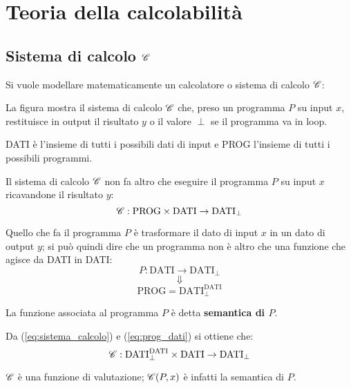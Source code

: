 \section{Teoria della calcolabilità}

\subsection{Sistema di calcolo \texorpdfstring{$\mathscr{C}$}{C}}
Si vuole modellare matematicamente un calcolatore o sistema di calcolo $\mathscr{C}$:
\vspace{.4cm}
\begin{figure}[h]
    \centering
    
\end{figure}

La figura mostra il sistema di calcolo $\mathscr{C}$ che, preso un programma $P$
su input $x$, restituisce in output il risultato $y$ o il valore $\perp$
se il programma va in loop.

DATI è l'insieme di tutti i possibili dati di input e PROG l'insieme di
tutti i possibili programmi.

Il sistema di calcolo $\mathscr{C}$ non fa altro che eseguire il programma $P$ su input
$x$ ricavandone il risultato $y$:
\begin{equation}\label{eq:sistema_calcolo}
\mathscr{C}:\text{PROG}\times\text{DATI}\rightarrow\text{DATI}_\perp
\end{equation}

Quello che fa il programma $P$ è trasformare il dato di input $x$ in un dato
di output $y$; si può quindi dire che un programma non è altro che
una funzione che agisce da DATI in DATI:
$$ P:\text{DATI} \rightarrow \text{DATI}_\perp $$
$$ \Downarrow $$
\begin{equation}\label{eq:prog_dati} \text{PROG} =
\text{DATI}^{\text{DATI}}_\perp \end{equation}

La funzione associata al programma $P$ è detta \textbf{semantica di $P$}.

Da (\ref{eq:sistema_calcolo}) e (\ref{eq:prog_dati}) si ottiene che:
$$ \mathscr{C}:\text{DATI}^{\text{DATI}}_\perp\times\text{DATI}
\rightarrow\text{DATI}_\perp $$

$\mathscr{C}$ è una funzione di valutazione; $\mathscr{C}(P,x)$ è infatti la semantica di $P$.

